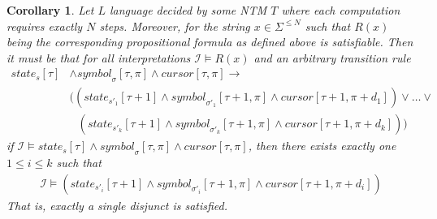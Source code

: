 \documentclass [11pt]{article}
\newtheorem{corollary}[theorem]{Corollary}
\newcommand{\sym}[3]{\textit{symbol}_{#1}[#2,#3]}
\newcommand{\cursor}[2]{\textit{cursor}[#1,#2]}
\newcommand{\state}[2]{\textit{state}_{#1}[#2]}
\begin{document}
\begin{corollary}
\label{cor:unique-trans}
Let $L$ language decided by some NTM $T$ where each computation requires exactly $N$ steps. Moreover, for the string $x \in \Sigma^{\leq N}$ such that $R(x)$  being the corresponding propositional formula as defined above is satisfiable.
Then it must be that for all interpretations $\mathcal{I} \models R(x)$ and an arbitrary transition rule 
\begin{equation*}
\begin{split}
\state{s}{\tau}& \wedge \sym{\sigma}{\tau}{\pi} \wedge \cursor{\tau}{\pi} \to \\
& \Big(({\state{s'_1}{\tau+1}}\wedge \sym{\sigma'_1}{\tau+1}{\pi} \wedge {\cursor{\tau+1}{\pi+d_1}} ) \vee \dots \vee \\
& \; \; \,  ({\state{s'_k}{\tau+1}} \wedge \sym{\sigma'_k}{\tau+1}{\pi} \wedge {\cursor{\tau+1}{\pi+d_k}} ) \Big)
\end{split}
\end{equation*}
if $\mathcal{I} \models \state{s}{\tau} \wedge \sym{\sigma}{\tau}{\pi} \wedge \cursor{\tau}{\pi}$, then there exists exactly one $1 \leq i \leq k$ such that 
\begin{equation*}
\begin{split}
\mathcal{I} \models ({\state{s'_i}{\tau+1}}\wedge \sym{\sigma'_i}{\tau+1}{\pi} \wedge {\cursor{\tau+1}{\pi+d_i}} )
\end{split}
\end{equation*}
That is, exactly a single disjunct is satisfied.
\end{corollary}
\end{document}
